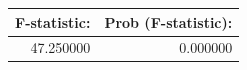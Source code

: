 \begin{tabular}{rr}
\toprule
F-statistic: & Prob (F-statistic): \\
\midrule
47.250000 & 0.000000 \\
\bottomrule
\end{tabular}
